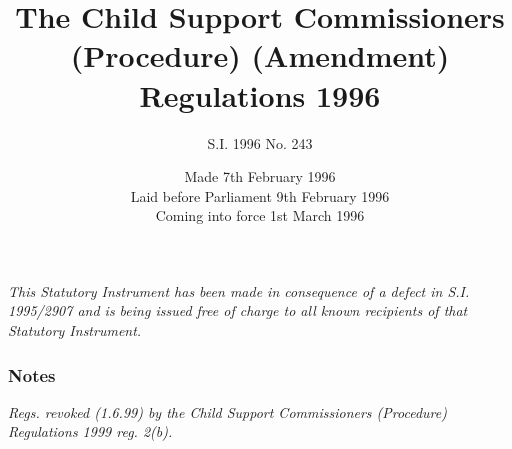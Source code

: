 \documentclass[a4paper]{article}
\title{The Child Support Commissioners (Procedure) (Amendment) Regulations 1996}
\author{S.I. 1996 No. 243}
\date{Made 7th February 1996\\Laid before Parliament 9th February 1996\\Coming into force 1st March 1996
}
\newcommand\amendment[1]{\subsubsection*{Notes}{\itshape\frenchspacing\footnotesize #1 \par}}
\begin{document}
\maketitle

\begin{center}\small\noindent\itshape
This Statutory Instrument has been made in consequence of a defect in S.I. 1995/2907 and is being issued free of charge to all known recipients of that Statutory Instrument.
\end{center}

\amendment{
Regs. revoked (1.6.99) by the Child Support Commissioners (Procedure) Regulations 1999 reg. 2(b).
}

%
%
%
%
%
%
%
%
%
%
%
%
%
\end{document}

